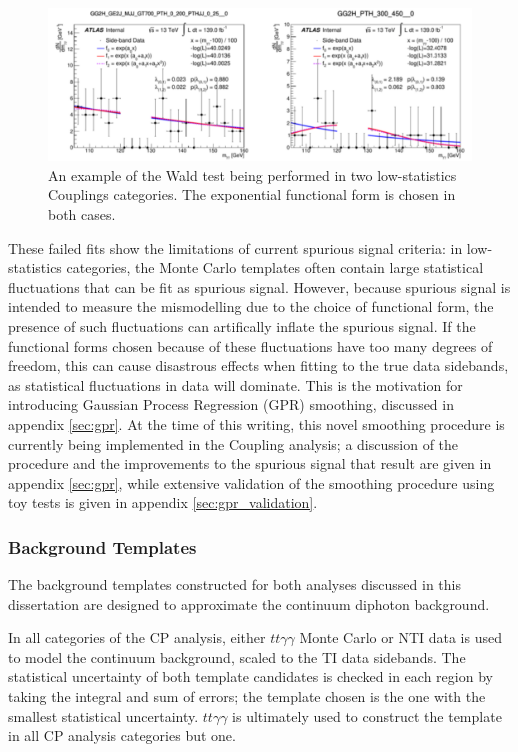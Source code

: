 \begin{figure}
\includegraphics[width=\linewidth]{figures/sigbkgparam/Walds.png}
\caption{An example of the Wald test being performed in two low-statistics Couplings categories. The exponential functional form is chosen in both cases.}
\label{fig:WaldTest}
\end{figure} 

These failed fits show the limitations of current spurious signal criteria: in low-statistics categories, the Monte Carlo templates often contain large statistical fluctuations that can be fit as spurious signal. However, because spurious signal is intended to measure the mismodelling due to the choice of functional form, the presence of such fluctuations can artifically inflate the spurious signal. If the functional forms chosen because of these fluctuations have too many degrees of freedom, this can cause disastrous effects when fitting to the true data sidebands, as statistical fluctuations in data will dominate. This is the motivation for introducing Gaussian Process Regression (GPR) smoothing, discussed in appendix \ref{sec:gpr}. At the time of this writing, this novel smoothing procedure is currently being implemented in the Coupling analysis; a discussion of the procedure and the improvements to the spurious signal that result are given in appendix \ref{sec:gpr}, while extensive validation of the smoothing procedure using toy tests is given in appendix \ref{sec:gpr_validation}.

\subsubsection{Background Templates} \label{sec:bkgtemplates} 

The background templates constructed for both analyses discussed in this dissertation are designed to approximate the continuum diphoton background. 

In all categories of the CP analysis, either $tt\gamma\gamma$ Monte Carlo or NTI data is used to model the continuum background, scaled to the TI data sidebands. The statistical uncertainty of both template candidates is checked in each region by taking the integral and sum of errors; the template chosen is the one with the smallest statistical uncertainty. $tt\gamma\gamma$ is ultimately used to construct the template in all CP analysis categories but one. 

